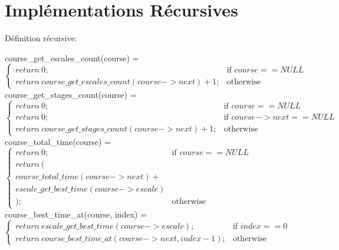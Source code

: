 \section{Implémentations Récursives}\label{recursivite}

Définition récursive:


course\_get\_escales\_count(course) = \\$
                \begin{cases}
                    return\ 0; & \text{if } course == NULL \\
                    return\ course\_get\_escales\_count(course->next) + 1; & \text{otherwise}
                \end{cases} $
\\

course\_get\_stages\_count(course) = \\$
                \begin{cases}
                    return\ 0; & \text{if } course == NULL \\
                    return\ 0; & \text{if } course->next == NULL \\
                    return\ course\_get\_stages\_count(course->next) + 1; & \text{otherwise}
                \end{cases} $
\\

course\_total\_time(course) = \\$
                \begin{cases}
                    return\ 0; & \text{if } course == NULL \\
                    return\ (\\
                    course\_total\_time(course->next) +\\
                    escale\_get\_best\_time(course->escale)\\
                    ); & \text{otherwise}
                \end{cases} $
\\

course\_best\_time\_at(course, index) = \\$
                \begin{cases}
                    return\ escale\_get\_best\_time(course->escale); & \text{if } index == 0 \\
                    return\ course\_best\_time\_at(course->next, index - 1); & \text{otherwise}
                \end{cases} $
\\

